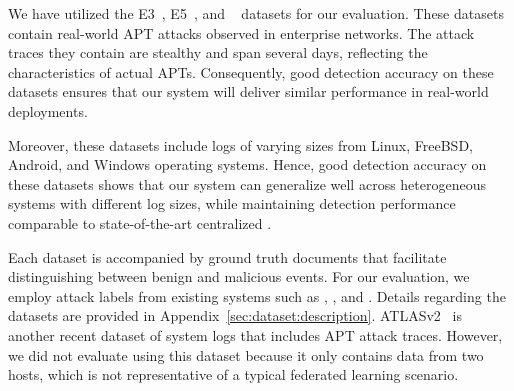 
We have utilized the \darpa E3~\cite{error3}, E5~\cite{bug5}, and \optc~\cite{darpaoptc} datasets for our evaluation. These datasets contain real-world APT attacks observed in enterprise networks. The attack traces they contain are stealthy and span several days, reflecting the characteristics of actual APTs. Consequently, good detection accuracy on these datasets ensures that our system will deliver similar performance in real-world deployments. 

Moreover, these datasets include logs of varying sizes from Linux, FreeBSD, Android, and Windows operating systems. Hence, good detection accuracy on these datasets shows that our system can generalize well across heterogeneous systems with different log sizes, while maintaining detection performance comparable to state-of-the-art centralized \pids.

Each \darpa dataset is accompanied by ground truth documents that facilitate distinguishing between benign and malicious events. For our evaluation, we employ attack labels from existing systems such as \threatrace, \kairos, and \flash. Details regarding the datasets are provided in Appendix~\ref{sec:dataset:description}. ATLASv2~\cite{riddle2023atlasv2} is another recent dataset of system logs that includes APT attack traces. However, we did not evaluate using this dataset because it only contains data from two hosts, which is not representative of a typical federated learning scenario.

